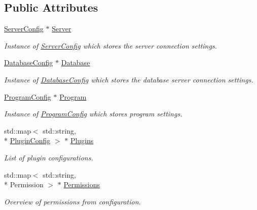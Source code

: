 \subsection*{Public Attributes}
\begin{DoxyCompactItemize}
\item 
\hypertarget{classConfig_a249a19a298cdcfd4223609142e15e5de}{\hyperlink{structServerConfig}{Server\-Config} $\ast$ \hyperlink{classConfig_a249a19a298cdcfd4223609142e15e5de}{Server}}\label{classConfig_a249a19a298cdcfd4223609142e15e5de}

\begin{DoxyCompactList}\small\item\em Instance of \hyperlink{structServerConfig}{Server\-Config} which stores the server connection settings. \end{DoxyCompactList}\item 
\hypertarget{classConfig_a7c1bdf72973da53666514dbd549cc400}{\hyperlink{structDatabaseConfig}{Database\-Config} $\ast$ \hyperlink{classConfig_a7c1bdf72973da53666514dbd549cc400}{Database}}\label{classConfig_a7c1bdf72973da53666514dbd549cc400}

\begin{DoxyCompactList}\small\item\em Instance of \hyperlink{structDatabaseConfig}{Database\-Config} which stores the database server connection settings. \end{DoxyCompactList}\item 
\hypertarget{classConfig_a2dea7bf45e7c8a8d2461a121b56504b3}{\hyperlink{structProgramConfig}{Program\-Config} $\ast$ \hyperlink{classConfig_a2dea7bf45e7c8a8d2461a121b56504b3}{Program}}\label{classConfig_a2dea7bf45e7c8a8d2461a121b56504b3}

\begin{DoxyCompactList}\small\item\em Instance of \hyperlink{structProgramConfig}{Program\-Config} which stores program settings. \end{DoxyCompactList}\item 
\hypertarget{classConfig_af02b6ade87bcdd8368788283e42a6b74}{std\-::map$<$ std\-::string, \\*
\hyperlink{structPluginConfig}{Plugin\-Config} $>$ $\ast$ \hyperlink{classConfig_af02b6ade87bcdd8368788283e42a6b74}{Plugins}}\label{classConfig_af02b6ade87bcdd8368788283e42a6b74}

\begin{DoxyCompactList}\small\item\em List of plugin configurations. \end{DoxyCompactList}\item 
\hypertarget{classConfig_a6615bbfedbc63f8e0cdf762fbb04063c}{std\-::map$<$ std\-::string, \\*
Permission $>$ $\ast$ \hyperlink{classConfig_a6615bbfedbc63f8e0cdf762fbb04063c}{Permissions}}\label{classConfig_a6615bbfedbc63f8e0cdf762fbb04063c}

\begin{DoxyCompactList}\small\item\em Overview of permissions from configuration. \end{DoxyCompactList}\end{DoxyCompactItemize}
